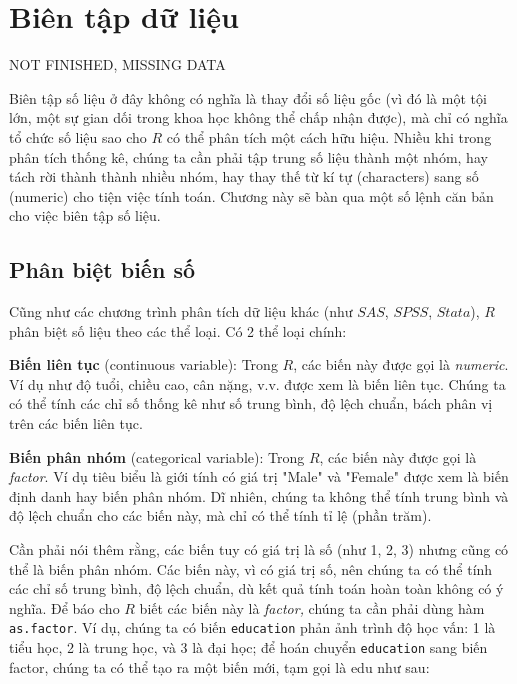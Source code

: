 \documentclass[
]{book}
\begin{document}
\hypertarget{Bien-tap-du-lieu}{%
\chapter{Biên tập dữ liệu}\label{Bien-tap-du-lieu}}

NOT FINISHED, MISSING DATA

Biên tập số liệu ở đây không có nghĩa là thay đổi số liệu gốc (vì đó là một tội lớn, một sự gian dối trong khoa học không thể chấp nhận được), mà chỉ có nghĩa tổ chức số liệu sao cho \(R\) có thể phân tích một cách hữu hiệu. Nhiều khi trong phân tích thống kê, chúng ta cần phải tập trung số liệu thành một nhóm, hay tách rời thành thành nhiều nhóm, hay thay thế từ kí tự (characters) sang số (numeric) cho tiện việc tính toán. Chương này sẽ bàn qua một số lệnh căn bản cho việc biên tập số liệu.

\hypertarget{phuxe2n-biux1ec7t-biux1ebfn-sux1ed1}{%
\section{Phân biệt biến số}\label{phuxe2n-biux1ec7t-biux1ebfn-sux1ed1}}

Cũng như các chương trình phân tích dữ liệu khác (như \(SAS\), \(SPSS\), \(Stata\)), \(R\) phân biệt số liệu theo các thể loại. Có 2 thể loại chính:

\textbf{Biến liên tục} (continuous variable): Trong \(R\), các biến này được gọi là \emph{numeric}. Ví dụ như độ tuổi, chiều cao, cân nặng, v.v. được xem là biến liên tục. Chúng ta có thể tính các chỉ số thống kê như số trung bình, độ lệch chuẩn, bách phân vị trên các biến liên tục.

\textbf{Biến phân nhóm} (categorical variable): Trong \(R\), các biến này được gọi là \emph{factor}. Ví dụ tiêu biểu là giới tính có giá trị "Male" và "Female" được xem là biến định danh hay biến phân nhóm. Dĩ nhiên, chúng ta không thể tính trung bình và độ lệch chuẩn cho các biến này, mà chỉ có thể tính tỉ lệ (phần trăm).

Cần phải nói thêm rằng, các biến tuy có giá trị là số (như 1, 2, 3) nhưng cũng có thể là biến phân nhóm. Các biến này, vì có giá trị số, nên chúng ta có thể tính các chỉ số trung bình, độ lệch chuẩn, dù kết quả tính toán hoàn toàn không có ý nghĩa. Để báo cho \(R\) biết các biến này là \emph{factor,} chúng ta cần phải dùng hàm \texttt{as.factor}. Ví dụ, chúng ta có biến \texttt{education} phản ảnh trình độ học vấn: 1 là tiểu học, 2 là trung học, và 3 là đại học; để hoán chuyển \texttt{education} sang biến factor, chúng ta có thể tạo ra một biến mới, tạm gọi là edu như sau:
\end{document}
